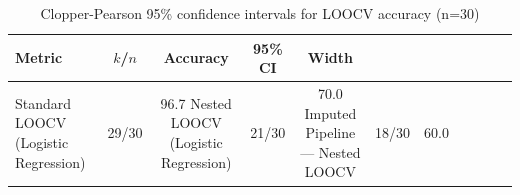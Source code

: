 \begin{table}[htbp]
\centering
\caption{Clopper-Pearson 95\% confidence intervals for LOOCV accuracy (n=30)}
\label{tab:ci}
\begin{tabular}{lcccc}
\toprule
Metric & $k$/$n$ & Accuracy & 95\% CI & Width \\
\midrule
Standard LOOCV (Logistic Regression) & 29/30 & 96.7%
Nested LOOCV (Logistic Regression) & 21/30 & 70.0%
Imputed Pipeline — Nested LOOCV & 18/30 & 60.0%
\bottomrule
{} \\
\end{tabular}
\end{table}